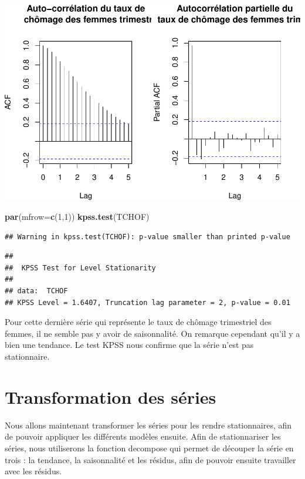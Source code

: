 \documentclass[11pt,]{article}
\newenvironment{Shaded}{\begin{snugshade}}{\end{snugshade}}
\newcommand{\KeywordTok}[1]{\textcolor[rgb]{0.13,0.29,0.53}{\textbf{{#1}}}}
\newcommand{\DataTypeTok}[1]{\textcolor[rgb]{0.13,0.29,0.53}{{#1}}}
\newcommand{\DecValTok}[1]{\textcolor[rgb]{0.00,0.00,0.81}{{#1}}}
\newcommand{\NormalTok}[1]{{#1}}
\begin{document}
\includegraphics{doc_files/figure-latex/unnamed-chunk-5-2.pdf}

\begin{Shaded}
\begin{Highlighting}[]
  \KeywordTok{par}\NormalTok{(}\DataTypeTok{mfrow=}\KeywordTok{c}\NormalTok{(}\DecValTok{1}\NormalTok{,}\DecValTok{1}\NormalTok{))}
  \KeywordTok{kpss.test}\NormalTok{(TCHOF)}
\end{Highlighting}
\end{Shaded}

\begin{verbatim}
## Warning in kpss.test(TCHOF): p-value smaller than printed p-value
\end{verbatim}

\begin{verbatim}
## 
##  KPSS Test for Level Stationarity
## 
## data:  TCHOF
## KPSS Level = 1.6407, Truncation lag parameter = 2, p-value = 0.01
\end{verbatim}

Pour cette dernière série qui représente le taux de chômage trimestriel
des femmes, il ne semble pas y avoir de saisonnalité. On remarque
cependant qu'il y a bien une tendance. Le test KPSS nous confirme que la
série n'est pas stationnaire.

\section{Transformation des séries}\label{transformation-des-series}

Nous allons maintenant transformer les séries pour les rendre
stationnaires, afin de pouvoir appliquer les différents modèles ensuite.
Afin de stationnariser les séries, nous utiliserons la fonction
decompose qui permet de découper la série en trois : la tendance, la
saisonnalité et les résidus, afin de pouvoir ensuite travailler avec les
résidus.
\end{document}

